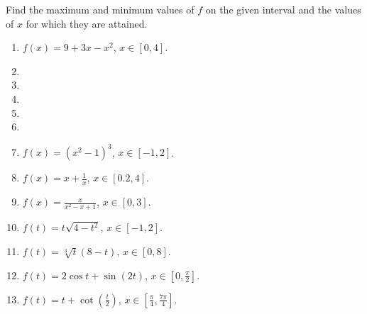 Find the maximum and minimum values of $f$ on the given interval and the values of $x$ for which they are attained.
\begin{multicols}{2}
\begin{enumerate}[ref={\fcProblemRef}]
\item $\displaystyle f(x)=9+3x-x^2$, $x\in [0,4]$.

\item 
\item 
\item 
\item 
\item 
\item $\displaystyle f(x)=(x^2-1)^3$, $x\in [-1, 2]$.

\item $\displaystyle f(x)=x+\frac{1}{x}$, $x\in [0.2,4 ]$.

\item $\displaystyle f(x)=\frac{x}{x^2-x+1}$, $x\in [0,3 ]$.

\item $\displaystyle f(t)=t\sqrt{4-t^2}$, $x\in [-1,2 ]$.

\item $\displaystyle f(t)=\sqrt[3]{t}(8-t) $, $x\in [0,8 ]$.

\item $\displaystyle f(t)=2\cos t+\sin (2t)$, $x\in [0,\frac{\pi}{2} ]$.

\item $\displaystyle f(t)=t+\cot \left(\frac{t}{2}\right) $, $x\in [\frac{\pi}{4},\frac{7\pi}{4} ]$.


\end{enumerate}
\end{multicols}
